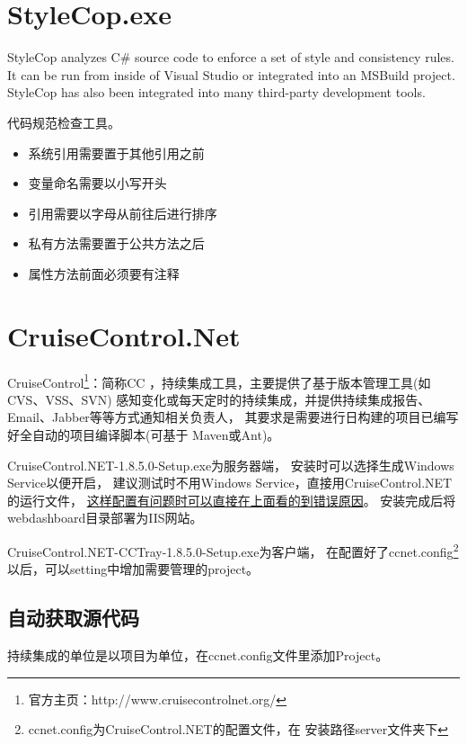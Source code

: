 \documentclass{book}
\begin{document}
\section{StyleCop.exe}

StyleCop analyzes C\# source code to enforce a set of style and consistency rules. It can be run from inside of Visual Studio or integrated into an MSBuild project. StyleCop has also been integrated into many third-party development tools.

代码规范检查工具。

\begin{itemize}
\item{系统引用需要置于其他引用之前}
\item{变量命名需要以小写开头}
\item{引用需要以字母从前往后进行排序}
\item{私有方法需要置于公共方法之后}
\item{属性方法前面必须要有注释}
\end{itemize}

\section{CruiseControl.Net}

CruiseControl\footnote{官方主页：http://www.cruisecontrolnet.org/}：简称CC ，持续集成工具，主要提供了基于版本管理工具(如CVS、VSS、SVN) 感知变化或每天定时的持续集成，并提供持续集成报告、Email、Jabber等等方式通知相关负责人，
其要求是需要进行日构建的项目已编写好全自动的项目编译脚本(可基于 Maven或Ant)。

CruiseControl.NET-1.8.5.0-Setup.exe为服务器端，
安装时可以选择生成Windows Service以便开启，
建议测试时不用Windows Service，直接用CruiseControl.NET 的运行文件，
\underline{这样配置有问题时可以直接在上面看的到错误原因}。
安装完成后将webdashboard目录部署为IIS网站。

CruiseControl.NET-CCTray-1.8.5.0-Setup.exe为客户端，
在配置好了ccnet.config\footnote{ccnet.config为CruiseControl.NET的配置文件，在
安装路径server文件夹下}以后，可以setting中增加需要管理的project。

\subsection{自动获取源代码}

持续集成的单位是以项目为单位，在ccnet.config文件里添加Project。
\end{document}
